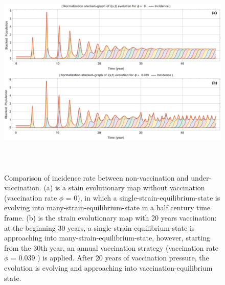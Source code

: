 \documentclass[preprint,12pt]{elsarticle}
\begin{document}
\begin{figure}
  \centering
  \includegraphics[width=6in,height=4in]{figures/UnderVaccination}
  \caption{Comparison of incidence rate between non-vaccination and under-vaccination.
  (a) is a stain evolutionary map without vaccination (vaccination rate \(\phi\) = 0), in which a single-strain-equilibrium-state is evolving into many-strain-equilibrium-state in a half century time frame. 
  (b) is the strain evolutionary map with 20 years vaccination: at the beginning 30 years, a single-strain-equilibrium-state is approaching into many-strain-equilibrium-state, however, starting from the 30th year, an annual vaccination strategy (vaccination rate \(\phi\) = 0.039 ) is applied. 
  After 20 years of vaccination pressure, the evolution is evolving and approaching into vaccination-equilibrium state.}
\label{fig:UnderVaccination}
\end{figure}

\newpage
\end{document}
